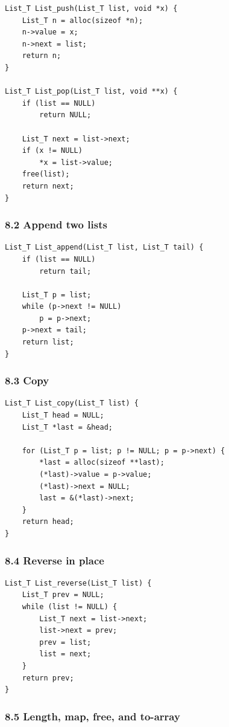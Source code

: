 \documentclass[11pt]{article}
\begin{document}
\begin{verbatim}
List_T List_push(List_T list, void *x) {
    List_T n = alloc(sizeof *n);
    n->value = x;
    n->next = list;
    return n;
}

List_T List_pop(List_T list, void **x) {
    if (list == NULL)
        return NULL;

    List_T next = list->next;
    if (x != NULL)
        *x = list->value;
    free(list);
    return next;
}
\end{verbatim}

\subsubsection{8.2 Append two lists}\label{append-two-lists}

\begin{verbatim}
List_T List_append(List_T list, List_T tail) {
    if (list == NULL)
        return tail;

    List_T p = list;
    while (p->next != NULL)
        p = p->next;
    p->next = tail;
    return list;
}
\end{verbatim}

\subsubsection{8.3 Copy}\label{copy}

\begin{verbatim}
List_T List_copy(List_T list) {
    List_T head = NULL;
    List_T *last = &head;

    for (List_T p = list; p != NULL; p = p->next) {
        *last = alloc(sizeof **last);
        (*last)->value = p->value;
        (*last)->next = NULL;
        last = &(*last)->next;
    }
    return head;
}
\end{verbatim}

\subsubsection{8.4 Reverse in place}\label{reverse-in-place}

\begin{verbatim}
List_T List_reverse(List_T list) {
    List_T prev = NULL;
    while (list != NULL) {
        List_T next = list->next;
        list->next = prev;
        prev = list;
        list = next;
    }
    return prev;
}
\end{verbatim}

\subsubsection{8.5 Length, map, free, and to-array}\label{length-map-free-and-to-array}
\end{document}
